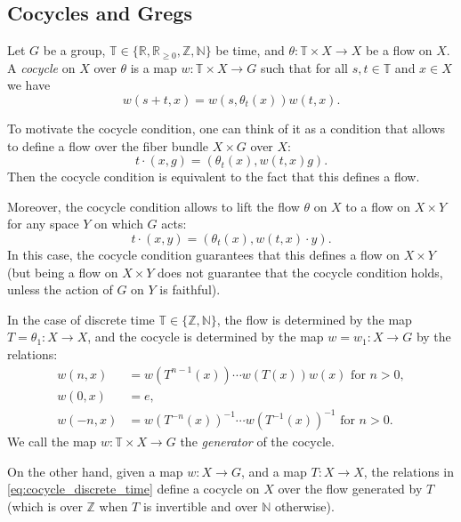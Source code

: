 \documentclass{report}
\begin{document}
\subsection{Cocycles and Gregs}
\begin{definition}
    Let $G$ be a group, $\mathbb T \in \{\mathbb R, \mathbb R_{\geq 0}, \mathbb Z, \mathbb N\}$ be time, and $\theta: \mathbb T \times X \to X$ be a flow on $X$.
        A \emph{cocycle} on $X$ over $\theta$ is a map $w: \mathbb T \times X \to G$ such that for all $s, t \in \mathbb T$ and $x \in X$ we have
        \[
        w(s+t, x) = w(s, \theta_t(x)) w(t, x).
        \]
\end{definition}
\begin{remark}
    To motivate the cocycle condition, one can think of it as a condition that allows to define a flow over the fiber bundle $X \times G$ over $X$:
    \[
    t \cdot (x, g) = (\theta_t(x), w(t,x) g).
    \]
    Then the cocycle condition is equivalent to the fact that this defines a flow.

    Moreover, the cocycle condition allows to lift the flow $\theta$ on $X$ to a flow on $X \times Y$ for any space $Y$ on which $G$ acts:
    \[
    t \cdot (x, y) = (\theta_t(x), w(t,x) \cdot y).
    \]
    In this case, the cocycle condition guarantees that this defines a flow on $X \times Y$ (but being a flow on $X \times Y$ does not guarantee that the cocycle condition holds, unless the action of $G$ on $Y$ is faithful).
\end{remark}
\begin{remark}
    In the case of discrete time $\mathbb T \in \{\mathbb Z, \mathbb N\}$, the flow is determined by the map $T = \theta_1: X \to X$, and the cocycle is determined by the map $w = w_1: X \to G$ by the relations:
    \begin{equation}\label{eq:cocycle_discrete_time}
        \begin{aligned}
            w(n, x) &= w(T^{n-1}(x)) \cdots w(T(x)) w(x) \text{ for } n > 0, \\
            w(0, x) &= e, \\
            w(-n, x) &= w(T^{-n}(x))^{-1} \cdots w(T^{-1}(x))^{-1} \text{ for } n > 0.
        \end{aligned}
    \end{equation}
    We call the map $w: \mathbb T \times X \to G$ the \emph{generator} of the cocycle.

    On the other hand, given a map $w: X \to G$, and a map $T: X \to X$, the relations in \cref{eq:cocycle_discrete_time} define a cocycle on $X$ over the flow generated by $T$ (which is over $\mathbb Z$ when $T$ is invertible and over $\mathbb N$ otherwise).
\end{remark}
\end{document}
